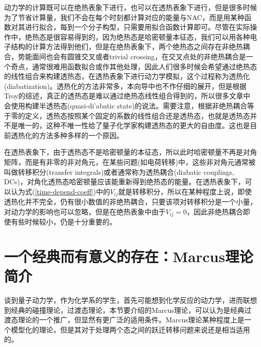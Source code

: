 \documentclass[12pt,a4paper,openany,twoside]{book}
\numberwithin{equation}{section}
\begin{document}
        动力学的计算既可以在绝热表象下进行，也可以在透热表象下进行，但是很多时候为了节省计算量，我们不会在每个时刻都计算对应的能量与NAC，而是用某种函数对其进行拟合，每到一个分子构型，只需要用拟合函数计算即可。尽管在实际操作中，绝热态是很容易得到的，因为绝热态是哈密顿量本征态，我们可以用各种电子结构的计算方法得到他们，但是在绝热表象下，两个绝热态之间存在非绝热耦合，势能面间也会有圆锥交叉或者trivial crossing，在交叉点处的非绝热耦合是一个奇点，通常很难用函数拟合或作其他处理，因此人们很多时候会希望通过绝热态的线性组合来构建透热态，在透热表象下进行动力学模拟，这个过程称为透热化(diabatization)。透热化的方法非常多，本向导中也不作仔细的展开，但是根据Troy的综述，真正的透热态是难以通过绝热态线性组合得到的，所以很多文章中会使用构建半透热态(quasi-di'abatic state)的说法。需要注意，根据非绝热耦合等于零的定义，透热态按照某个固定的系数的线性组合还是透热态，也就是透热态并不是唯一的，这种不唯一性给了量子化学家构建透热态的更大的自由度。这也是目前透热化的方法多种多样的一个原因。

        在透热表象下，由于透热态不是哈密顿量的本征态，所以此时哈密顿量不再是对角矩阵，而是有非零的非对角元，在某些问题(如电荷转移)中，这些非对角元通常被叫做转移积分(transfer integrals)或者通常称为透热耦合(diabatic couplings, DCs)，对角化透热态哈密顿量应该能重新得到绝热态的能量。在透热表象下，可以认为式(\ref{time-depend-coeff})中的$V_{ij}$就是转移积分，所以在某种程度上说，即使透热化并不完全，仍有很小数值的非绝热耦合，只要该项对转移积分是一个小量，对动力学的影响也可以忽略，但是在绝热表象中由于$V_{ij}=0$，因此非绝热耦合即使有些时候较小，仍是十分重要的。
      \section{一个经典而有意义的存在：Marcus理论简介}
        谈到量子动力学，作为化学系的学生，首先可能想到化学反应的动力学，进而联想到经典的碰撞理论，过渡态理论，本节要介绍的Marcus理论，可以认为是经典过渡态理论的一个推广，但显然有更广泛的适用条件。Marcus理论某种程度上是一个模型化的理论，但是其对于处理两个态之间的跃迁转移问题来说还是相当适用的。
\end{document}
